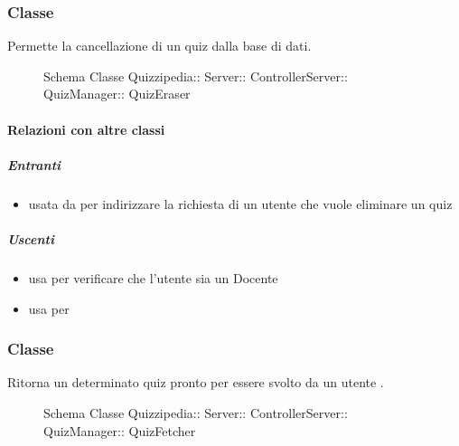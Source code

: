 \subsubsection{Classe }
Permette la cancellazione di un quiz dalla base di dati.
\begin{figure}[H]
\centering
\noindent{}
\caption[Schema Classe QuizEraser]{Schema Classe Quizzipedia:: Server:: ControllerServer:: QuizManager:: QuizEraser}
\end{figure}
\paragraph{Relazioni con altre classi}
\subparagraph{Entranti}
\begin{itemize}
\item usata da  per indirizzare la richiesta di un utente che vuole eliminare un quiz
\end{itemize}
\subparagraph{Uscenti}
\begin{itemize}
\item usa  per verificare che l'utente sia un Docente
\item usa  per 
\end{itemize}
\subsubsection{Classe }
Ritorna un determinato quiz pronto per essere svolto da un utente .
\begin{figure}[H]
\centering
\noindent{}
\caption[Schema Classe QuizFetcher]{Schema Classe Quizzipedia:: Server:: ControllerServer:: QuizManager:: QuizFetcher}
\end{figure}
